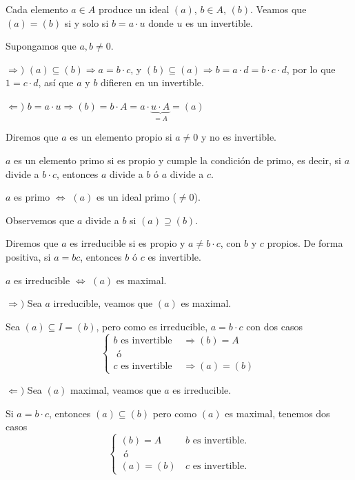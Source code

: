 \begin{prop}
Cada elemento $a\in A$ produce un ideal $(a)$, $b\in A$, $(b)$. Veamos que $(a) = (b)$ si y solo si $b =a\cdot u$ donde $u$ es un invertible.
\end{prop}
\begin{dem}
    Supongamos que $a, b\neq 0$. 
    
    $\Rightarrow)$ $(a) \subseteq (b) \Rightarrow a=b\cdot c$, y $(b)\subseteq (a) \Rightarrow b =a\cdot d = b\cdot c \cdot d$, por lo que $1 = c\cdot d$, as\'i que $a$ y $b$ difieren en un invertible.

    $\Leftarrow)$ $b =a\cdot u \Rightarrow (b) = b \cdot A = a \cdot\underbrace{ u \cdot A}_{=A} = (a)$
\end{dem}
\begin{defi}
    Diremos que $a$ es un elemento propio si $a\neq 0$ y no es invertible.
\end{defi}
\begin{defi}
    $a$ es un elemento primo si es propio y cumple la condici\'on de primo, es decir, si $a$ divide a $b\cdot c$, entonces $a$ divide a $b$ \'o $a$ divide a $c$.  
\end{defi}
\begin{prop}
    $a$ es primo $\iff$ $(a)$ es un ideal primo ($\neq 0$). 
\end{prop}
Observemos que $a$ divide a $b$ si $(a) \supseteq (b)$. 
\begin{defi}
    Diremos que $a$ es irreducible si es propio y $a\neq b \cdot c$, con $b$ y $c$ propios. De forma positiva, si $a=bc$, entonces $b$ \'o $c$ es invertible.
\end{defi}
\begin{prop}
    $a$ es irreducible $\iff$ $(a)$ es maximal.
\end{prop}
\begin{dem}
    $\Rightarrow) $ Sea $a$ irreducible, veamos que $(a)$ es maximal.

    Sea $(a) \subseteq I = (b)$, pero como es irreducible, $a = b \cdot c$ con dos casos
    $$\begin{cases}
        b \text{ es invertible } & \Rightarrow (b) = A \\ \text{ \'o} \\ c \text{ es invertible} & \Rightarrow (a) = (b)
    \end{cases}$$

    $\Leftarrow)$ Sea $(a)$ maximal, veamos que $a$ es irreducible.

    Si $a=b \cdot c$, entonces $(a) \subseteq (b)$ pero como $(a)$ es maximal, tenemos dos casos
    $$\begin{cases}
        (b) = A &\, b \text{ es invertible.}\\ \text{ \'o} \\ (a) = (b) &\, c \text{ es invertible.}
    \end{cases}$$
\end{dem}
